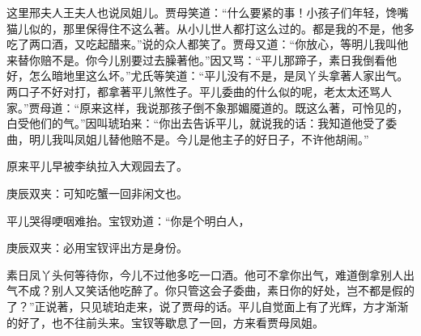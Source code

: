 \begin{parag}
    这里邢夫人王夫人也说凤姐儿。贾母笑道：“什么要紧的事！小孩子们年轻，馋嘴猫儿似的，那里保得住不这么著。从小儿世人都打这么过的。都是我的不是，他多吃了两口酒，又吃起醋来。”说的众人都笑了。贾母又道：“你放心，等明儿我叫他来替你赔不是。你今儿别要过去臊著他。”因又骂：“平儿那蹄子，素日我倒看他好，怎么暗地里这么坏。”尤氏等笑道：“平儿没有不是，是凤丫头拿著人家出气。两口子不好对打，都拿著平儿煞性子。平儿委曲的什么似的呢，老太太还骂人家。”贾母道：“原来这样，我说那孩子倒不象那媚魇道的。既这么著，可怜见的，白受他们的气。”因叫琥珀来：“你出去告诉平儿，就说我的话：我知道他受了委曲，明儿我叫凤姐儿替他赔不是。今儿是他主子的好日子，不许他胡闹。”
\end{parag}


\begin{parag}
    原来平儿早被李纨拉入大观园去了。\begin{note}庚辰双夹：可知吃蟹一回非闲文也。\end{note}平儿哭得哽咽难抬。宝钗劝道：“你是个明白人，\begin{note}庚辰双夹：必用宝钗评出方是身份。\end{note}素日凤丫头何等待你，今儿不过他多吃一口酒。他可不拿你出气，难道倒拿别人出气不成？别人又笑话他吃醉了。你只管这会子委曲，素日你的好处，岂不都是假的了？”正说著，只见琥珀走来，说了贾母的话。平儿自觉面上有了光辉，方才渐渐的好了，也不往前头来。宝钗等歇息了一回，方来看贾母凤姐。
\end{parag}


